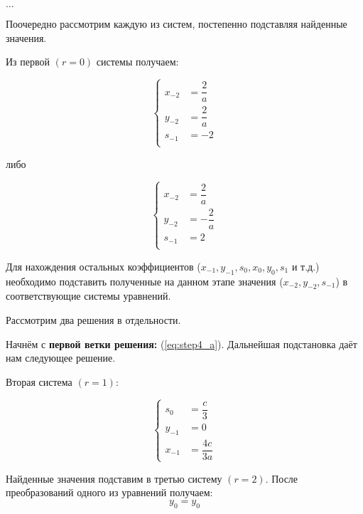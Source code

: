 \begin{center}
	$ \ldots $
\end{center}

\clearpage
						
Поочередно рассмотрим каждую из систем, постепенно подставляя найденные значения.

Из первой $ (r = 0) $ системы получаем:

\begin{equation}
	\label{eq:step4_a}
	\left\{
		\begin{aligned}
		  x_{-2} &= \dfrac{2}{a} \\
		  y_{-2} &= \dfrac{2}{a} \\
		  s_{-1} &= -2 \\
		\end{aligned}
	\right.
\end{equation}

\begin{center}
  либо
\end{center}

\begin{equation}
	\label{eq:step4_b}
	\left\{
		\begin{aligned}
		  x_{-2} &= \dfrac{2}{a} \\
		  y_{-2} &= -\dfrac{2}{a} \\
		  s_{-1} &= 2 \\
		\end{aligned}
	\right.
\end{equation}

Для нахождения остальных коэффициентов ($ x_{-1}, y_{-1}, s_{0}, x_{0}, y_{0}, s_{1} $ и т.д.) необходимо подставить полученные на данном этапе значения ($ x_{-2}, y_{-2}, s_{-1} $) в соответствующие системы уравнений.

Рассмотрим два решения в отдельности. 

Начнём с \textbf{первой ветки решения:} (\ref{eq:step4_a}). Дальнейшая подстановка даёт нам следующее решение.

Вторая система $ (r = 1) $:

$$
\left\{
	\begin{aligned}
		s_{0} &= \dfrac{c}{3} \\
		y_{-1} &= 0 \\
		x_{-1} &= \dfrac{4c}{3a}
	\end{aligned}
\right.
$$

Найденные значения подставим в третью систему $ (r = 2) $. После преобразований одного из уравнений получаем:
$$ 
	y_0 = y_0
$$ 

